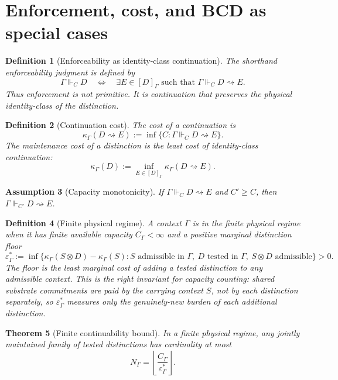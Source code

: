 \documentclass[11pt]{article}
\newtheorem{theorem}{Theorem}[section]
\newtheorem{definition}[theorem]{Definition}
\newtheorem{assumption}[theorem]{Assumption}
\theoremstyle{remark}
\newcommand{\G}{\Gamma}
\newcommand{\entails}{\Vdash}
\newcommand{\goes}{\rightsquigarrow}
\newcommand{\Cost}{\kappa}
\newcommand{\floor}{\varepsilon^{\!*}_{\G}}
\begin{document}
\section{Enforcement, cost, and BCD as special cases}

\begin{definition}[Enforceability as identity-class continuation]
The shorthand enforceability judgment is defined by
\[
        \G\entails_C D
        \quad\Longleftrightarrow\quad
        \exists E\in[D]_\G\text{ such that }\G\entails_C D\goes E.
\]
Thus enforcement is not primitive.  It is continuation that preserves the physical identity-class of the distinction.
\end{definition}

\begin{definition}[Continuation cost]
The cost of a continuation is
\[
        \Cost_\G(D\goes E)
        :=
        \inf\{C:\G\entails_C D\goes E\}.
\]
The maintenance cost of a distinction is the least cost of identity-class continuation:
\[
        \Cost_\G(D)
        :=
        \inf_{E\in[D]_\G}\Cost_\G(D\goes E).
\]
\end{definition}

\begin{assumption}[Capacity monotonicity]\label{ass:cap-mono}
If \(\G\entails_C D\goes E\) and \(C'\ge C\), then \(\G\entails_{C'} D\goes E\).
\end{assumption}

\begin{definition}[Finite physical regime]
A context \(\G\) is in the finite physical regime when it has finite available capacity \(C_\G<\infty\) and a positive marginal distinction floor
\[
        \floor:=\inf\Big\{\Cost_\G(S\otimes D)-\Cost_\G(S):S\text{ admissible in }\G,\ D\text{ tested in }\G,\ S\otimes D\text{ admissible}\Big\}>0.
\]
The floor is the least marginal cost of adding a tested distinction to any admissible context.  This is the right invariant for capacity counting: shared substrate commitments are paid by the carrying context $S$, not by each distinction separately, so $\floor$ measures only the genuinely-new burden of each additional distinction.
\end{definition}

\begin{theorem}[Finite continuability bound]
In a finite physical regime, any jointly maintained family of tested distinctions has cardinality at most
\[
        N_\G=\left\lfloor \frac{C_\G}{\floor}\right\rfloor .
\]
\end{theorem}
\end{document}
